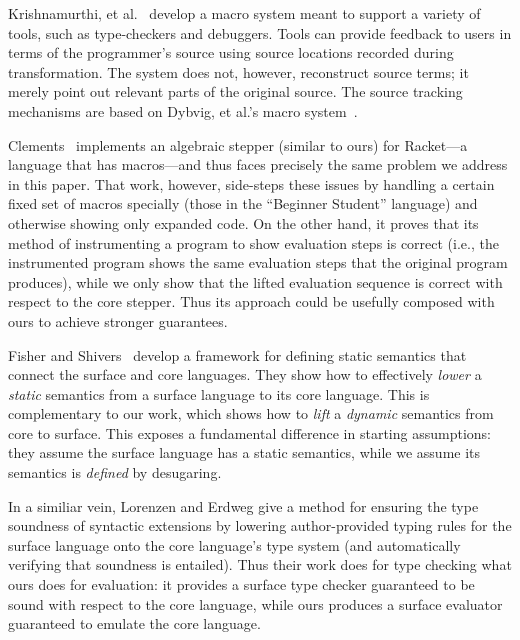 Krishnamurthi, et al.~\cite{sk:mcmicmac} develop a macro system meant
to support a variety of tools, such as type-checkers and
debuggers. Tools can provide feedback to users in terms of the
programmer's source using source locations recorded during
transformation. The system does not, however, reconstruct source
terms; it merely point out relevant parts of the original source.  The
source tracking mechanisms are based on Dybvig, et al.'s macro
system~\cite{expansion-passing-style}.

Clements~\cite[page 53]{clements:thesis} implements an algebraic
stepper (similar to ours) for Racket---a language that has
macros---and thus faces precisely the same problem we address in this
paper. That work, however, side-steps these issues by handling a
certain fixed set of macros specially (those in the ``Beginner
Student'' language) and otherwise showing only expanded code.
On the other hand, it proves that its method of instrumenting a program to
show evaluation steps is correct (i.e., the instrumented program shows the
same evaluation steps that the original program produces),
while we only show that the lifted evaluation sequence is correct
with respect to the core stepper. Thus its approach could be
usefully composed with ours to achieve stronger guarantees.

Fisher and Shivers~\cite{ziggurat} develop a framework
for defining static semantics that connect the
surface and core languages. They show how to effectively \emph{lower}
a \emph{static} semantics from a surface language to its core
language. This is complementary to our work, which
shows how to \emph{lift} a \emph{dynamic} semantics from core to surface.
This exposes a fundamental difference in starting assumptions:
they assume the surface language has a static semantics, while we assume
its semantics is \emph{defined} by desugaring.

In a similiar vein, Lorenzen and Erdweg \cite{typechecking-exts} give a
method for ensuring the type soundness of syntactic extensions by lowering
author-provided typing rules for the surface language onto the core
language's type system (and automatically verifying that soundness is
entailed). Thus their work does for type checking what ours does for
evaluation: it provides a surface type checker guaranteed to be sound with
respect to the core language, while ours produces a surface evaluator
guaranteed to emulate the core language.

